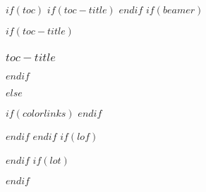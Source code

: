 $if(toc)$
$if(toc-title)$
\renewcommand*\contentsname{$toc-title$}
$endif$
$if(beamer)$
\begin{frame}[allowframebreaks]
  $if(toc-title)$
  \frametitle{$toc-title$}
  $endif$
  \setcounter{tocdepth}{$toc-depth$}
  \tableofcontents
\end{frame}
$else$
{
  $if(colorlinks)$
  $endif$
  \setcounter{tocdepth}{$toc-depth$}
  \begin{customtcolorbox} %
    \tableofcontents
  \end{customtcolorbox}
}
$endif$
$endif$
$if(lof)$
\begin{customtcolorbox} %
  \listoffigures
\end{customtcolorbox}
$endif$
$if(lot)$
\begin{customtcolorbox} %
  \listoftables
\end{customtcolorbox}
$endif$
